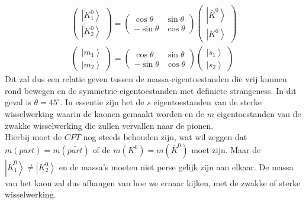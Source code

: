 \documentclass[../main.tex]{subfiles}
\begin{document}
\begin{equation}
    \begin{aligned}
        \label{eq:kaon_cp_eig_mat}
        \left(\begin{array}{c}
            \left| K_{1}^{0}\right> \\
            \left| K_{2}^{0}\right>
            \end{array}\right)=\left(\begin{array}{cc}
                \cos \theta & \sin \theta \\
                -\sin \theta & \cos \theta
            \end{array}\right)\left(\begin{array}{c}
            \left| \bar{K}^{0}\right> \\
            \left| K^{0}\right>
        \end{array}\right)\\
        \left(\begin{array}{c}
            \left| m_{1}\right> \\
            \left| m_{2}\right>
            \end{array}\right)=\left(\begin{array}{cc}
                \cos \theta & \sin \theta \\
                -\sin \theta & \cos \theta
            \end{array}\right)\left(\begin{array}{c}
            \left| s_{1}\right> \\
            \left| s_{2}\right>
        \end{array}\right)
    \end{aligned}
\end{equation}
Dit zal dus een relatie geven tussen de massa-eigentoestanden die vrij kunnen rond bewegen en de symmetrie-eigentoestanden met definiete strangeness. In dit geval is $\theta=45^\circ$. In essentie zijn het de $s$ eigentoestanden van de sterke wisselwerking waarin de kaonen gemaakt worden en de $m$ eigentoestanden van de zwakke wisselwerking die zullen vervallen naar de pionen.\\
Hierbij moet de $CPT$ nog steeds behouden zijn, wat wil zeggen dat $m(part) = m(\bar{part})$ of de $m(K^0) = m(\bar{K}^0)$ moet zijn. Maar de $\left|\bar{K}_{1}^{0}\right>\neq\left| K_{2}^{0}\right>$ en de massa's moeten niet perse gelijk zijn aan elkaar. De massa van het kaon zal dus afhangen van hoe we ernaar kijken, met de zwakke of sterke wisselwerking.
\end{document}
